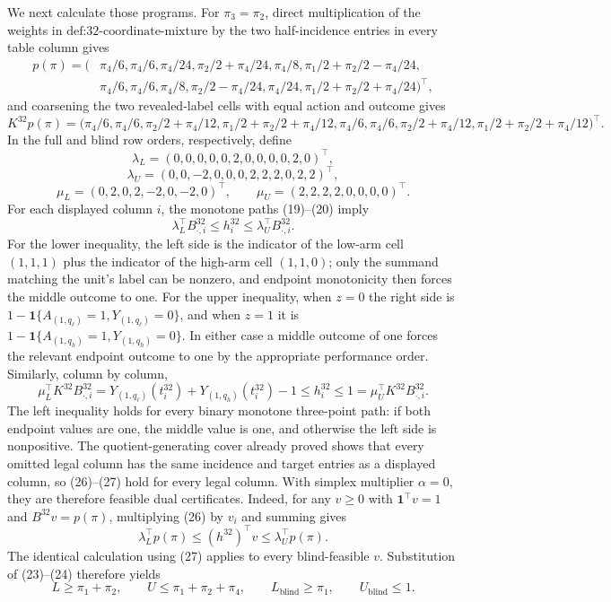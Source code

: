 We next calculate those programs.  For \(\pi_3=\pi_2\), direct multiplication of the weights in \(\text{def:32-coordinate-mixture}\) by the two half-incidence entries in every table column gives
\[
\begin{split}
p(\pi)=\bigl(&\pi_4/6,\pi_4/6,\pi_4/24,\pi_2/2+\pi_4/24,\pi_4/8,
\pi_1/2+\pi_2/2-\pi_4/24,\\
&\pi_4/6,\pi_4/6,\pi_4/8,\pi_2/2-\pi_4/24,\pi_4/24,
\pi_1/2+\pi_2/2+\pi_4/24\bigr)^{\top},
\end{split}
\tag{23}
\]
and coarsening the two revealed-label cells with equal action and outcome gives
\[
K^{32}p(\pi)=\bigl(\pi_4/6,\pi_4/6,\pi_2/2+\pi_4/12,
\pi_1/2+\pi_2/2+\pi_4/12,\pi_4/6,\pi_4/6,
\pi_2/2+\pi_4/12,\pi_1/2+\pi_2/2+\pi_4/12\bigr)^{\top}.
\tag{24}
\]
In the full and blind row orders, respectively, define
\[
\lambda_L=(0,0,0,0,0,2,0,0,0,0,2,0)^{\top},
\]
\[
\lambda_U=(0,0,-2,0,0,0,2,2,2,0,2,2)^{\top},
\]
\[
\mu_L=(0,2,0,2,-2,0,-2,0)^{\top},
\qquad
\mu_U=(2,2,2,2,0,0,0,0)^{\top}.
\tag{25}
\]
For each displayed column \(i\), the monotone paths (19)--(20) imply
\[
\lambda_L^{\top}B^{32}_{\cdot,i}\leq h^{32}_i
\leq\lambda_U^{\top}B^{32}_{\cdot,i}.
\tag{26}
\]
For the lower inequality, the left side is the indicator of the low-arm cell \((1,1,1)\) plus the indicator of the high-arm cell \((1,1,0)\); only the summand matching the unit's label can be nonzero, and endpoint monotonicity then forces the middle outcome to one.  For the upper inequality, when \(z=0\) the right side is \(1-\mathbf 1\{A_{(1,q_\ell)}=1,Y_{(1,q_\ell)}=0\}\), and when \(z=1\) it is \(1-\mathbf 1\{A_{(1,q_h)}=1,Y_{(1,q_h)}=0\}\).  In either case a middle outcome of one forces the relevant endpoint outcome to one by the appropriate performance order.  Similarly, column by column,
\[
\mu_L^{\top}K^{32}B^{32}_{\cdot,i}
=Y_{(1,q_\ell)}(t_i^{32})+Y_{(1,q_h)}(t_i^{32})-1
\leq h_i^{32}
\leq 1
=\mu_U^{\top}K^{32}B^{32}_{\cdot,i}.
\tag{27}
\]
The left inequality holds for every binary monotone three-point path: if both endpoint values are one, the middle value is one, and otherwise the left side is nonpositive.  The quotient-generating cover already proved shows that every omitted legal column has the same incidence and target entries as a displayed column, so (26)--(27) hold for every legal column.  With simplex multiplier \(\alpha=0\), they are therefore feasible dual certificates.  Indeed, for any \(v\geq0\) with \(\mathbf 1^{\top}v=1\) and \(B^{32}v=p(\pi)\), multiplying (26) by \(v_i\) and summing gives
\[
\lambda_L^{\top}p(\pi)\leq (h^{32})^{\top}v
\leq\lambda_U^{\top}p(\pi).
\]
The identical calculation using (27) applies to every blind-feasible \(v\).  Substitution of (23)--(24) therefore yields
\[
L\geq\pi_1+\pi_2,\qquad
U\leq\pi_1+\pi_2+\pi_4,\qquad
L_{\mathrm{blind}}\geq\pi_1,\qquad
U_{\mathrm{blind}}\leq1.
\tag{28}
\]

